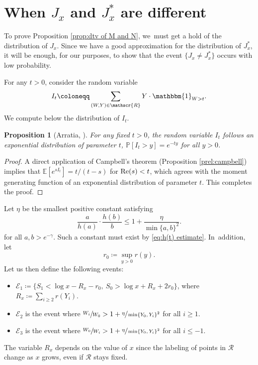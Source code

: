 \documentclass[10pt]{amsart}
\newcommand{\PP}{\mathbb{P}}
\newcommand{\EE}{\mathbb{E}}
\newcommand{\one}{\mathbbm{1}}
\newcommand{\EC}{\mathcal{E}}
\newcommand{\RS}{\mathscr{R}}
\newcommand{\prob}[1]{\PP[ #1 ]}
\renewcommand{\Re}{\textup{Re}}
\newcommand{\bg}{\big}
\theoremstyle{plain}
\newtheorem{prop}[cor]{Proposition}
\theoremstyle{definition}
\begin{document}
\section{When \texorpdfstring{$J_x$ and $J_x^*$}{Jxx} are different}
\label{sec:different J and J*}

To prove Proposition \ref{prop:dtv of M and N}, we~must get a hold of the distribution of $J_x$. Since we have a good approximation for the distribution of $J_x^*$, it will be enough, for our purposes, to show that the event $\{J_x\neq J_x^*\}$ occurs with low probability.

For any $t > 0$, consider the random variable
\[
I_t \coloneqq \sum_{(W,Y)\in \RS} Y\cdot \one_{W>t}.
\]
We compute below the distribution of $I_t$.

\begin{prop}[Arratia, \cite{Arratia02}]
\label{prop:icexponential}
For any fixed $t > 0$, the random variable $I_t$ follows an exponential distribution of parameter $t$, \ie $\prob{I_t > y} = e^{-ty}$ for all $y > 0$.
\end{prop}

\begin{proof}
A direct application of Campbell's theorem (Proposition \ref{prel:campbell}) implies that $\EE[e^{sI_t}]=t/(t-s)$ for $\Re(s)<t$, which agrees with the moment generating function of an exponential distribution of parameter $t$. This completes the proof.
\end{proof}

Let $\eta$ be the smallest positive constant satisfying
\[
\frac{a}{h(a)}\cdot \frac{h(b)}{b} \le 1 + \frac{\eta}{\min\{a,b\}^2}.
\]
for all $a, b > e^{-\gamma}$. Such a constant must exist by \eqref{eq:h(t) estimate}. In~addition, let
\[
r_0\coloneqq \sup_{y > 0} r(y).
\]
Let us then define the following events:

\begin{itemize}
\item $\EC_1\coloneqq \bg\{ S_1<\log x-R_x-r_0,\ S_0>\log x+R_x+2r_0\bg\}$, where $R_x\coloneqq \sum_{i\ge2} r(Y_i)$.

\item $\EC_2$ is the event where $\sfrac{W_i}{W_0} > 1 + \sfrac{\eta}{\min\{Y_0,Y_i\}^2}$ for all $i \ge 1$.

\item $\EC_3$ is the event where $\sfrac{W_0}{W_i} > 1 + \sfrac{\eta}{\min\{Y_0,Y_i\}^2}$ for all $i \le -1$.
\end{itemize}
The variable $R_x$ depends on the value of $x$ since the labeling of points in $\mathscr R$ change as $x$ grows, even if $\mathscr R$ stays fixed.
\end{document}
